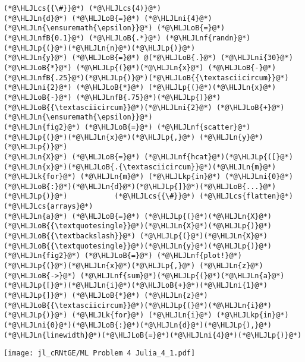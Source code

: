 \documentclass[12pt,a4paper]{article}
\newcommand{\HLJLk}[1]{\textcolor[RGB]{148,91,176}{\textbf{#1}}}
\newcommand{\HLJLkp}[1]{\textcolor[RGB]{148,91,176}{\textbf{#1}}}
\newcommand{\HLJLn}[1]{#1}
\newcommand{\HLJLnf}[1]{\textcolor[RGB]{66,102,213}{#1}}
\newcommand{\HLJLnfB}[1]{\textcolor[RGB]{59,151,46}{#1}}
\newcommand{\HLJLni}[1]{\textcolor[RGB]{59,151,46}{#1}}
\newcommand{\HLJLoB}[1]{\textcolor[RGB]{102,102,102}{\textbf{#1}}}
\newcommand{\HLJLp}[1]{#1}
\newcommand{\HLJLcs}[1]{\textcolor[RGB]{153,153,119}{\textit{#1}}}
\begin{document}
\begin{lstlisting}
(*@\HLJLcs{{\#}}@*) (*@\HLJLcs{4)}@*)
(*@\HLJLn{d}@*) (*@\HLJLoB{=}@*) (*@\HLJLni{4}@*)
(*@\HLJLn{\ensuremath{\epsilon}}@*) (*@\HLJLoB{=}@*) (*@\HLJLnfB{0.1}@*) (*@\HLJLoB{.*}@*) (*@\HLJLnf{randn}@*)(*@\HLJLp{(}@*)(*@\HLJLn{n}@*)(*@\HLJLp{)}@*)
(*@\HLJLn{y}@*) (*@\HLJLoB{=}@*) @(*@\HLJLoB{.}@*) (*@\HLJLni{30}@*) (*@\HLJLoB{*}@*) (*@\HLJLp{(}@*)(*@\HLJLn{x}@*) (*@\HLJLoB{-}@*) (*@\HLJLnfB{.25}@*)(*@\HLJLp{)}@*)(*@\HLJLoB{{\textasciicircum}}@*)(*@\HLJLni{2}@*) (*@\HLJLoB{*}@*) (*@\HLJLp{(}@*)(*@\HLJLn{x}@*) (*@\HLJLoB{-}@*) (*@\HLJLnfB{.75}@*)(*@\HLJLp{)}@*)(*@\HLJLoB{{\textasciicircum}}@*)(*@\HLJLni{2}@*) (*@\HLJLoB{+}@*) (*@\HLJLn{\ensuremath{\epsilon}}@*)
(*@\HLJLn{fig2}@*) (*@\HLJLoB{=}@*) (*@\HLJLnf{scatter}@*)(*@\HLJLp{(}@*)(*@\HLJLn{x}@*)(*@\HLJLp{,}@*) (*@\HLJLn{y}@*)(*@\HLJLp{)}@*)
(*@\HLJLn{X}@*) (*@\HLJLoB{=}@*) (*@\HLJLnf{hcat}@*)(*@\HLJLp{([}@*)(*@\HLJLn{x}@*)(*@\HLJLoB{.{\textasciicircum}}@*)(*@\HLJLn{m}@*) (*@\HLJLk{for}@*) (*@\HLJLn{m}@*) (*@\HLJLkp{in}@*) (*@\HLJLni{0}@*)(*@\HLJLoB{:}@*)(*@\HLJLn{d}@*)(*@\HLJLp{]}@*)(*@\HLJLoB{...}@*)(*@\HLJLp{)}@*)           (*@\HLJLcs{{\#}}@*) (*@\HLJLcs{flatten}@*) (*@\HLJLcs{arrays}@*)
(*@\HLJLn{a}@*) (*@\HLJLoB{=}@*) (*@\HLJLp{(}@*)(*@\HLJLn{X}@*)(*@\HLJLoB{{\textquotesingle}}@*)(*@\HLJLn{X}@*)(*@\HLJLp{)}@*) (*@\HLJLoB{{\textbackslash}}@*) (*@\HLJLp{(}@*)(*@\HLJLn{X}@*)(*@\HLJLoB{{\textquotesingle}}@*)(*@\HLJLn{y}@*)(*@\HLJLp{)}@*)
(*@\HLJLn{fig2}@*) (*@\HLJLoB{=}@*) (*@\HLJLnf{plot!}@*)(*@\HLJLp{(}@*)(*@\HLJLn{x}@*)(*@\HLJLp{,}@*) (*@\HLJLn{z}@*) (*@\HLJLoB{->}@*) (*@\HLJLnf{sum}@*)(*@\HLJLp{(}@*)(*@\HLJLn{a}@*)(*@\HLJLp{[}@*)(*@\HLJLn{i}@*)(*@\HLJLoB{+}@*)(*@\HLJLni{1}@*)(*@\HLJLp{]}@*) (*@\HLJLoB{*}@*) (*@\HLJLn{z}@*)(*@\HLJLoB{{\textasciicircum}}@*)(*@\HLJLp{(}@*)(*@\HLJLn{i}@*)(*@\HLJLp{)}@*) (*@\HLJLk{for}@*) (*@\HLJLn{i}@*) (*@\HLJLkp{in}@*) (*@\HLJLni{0}@*)(*@\HLJLoB{:}@*)(*@\HLJLn{d}@*)(*@\HLJLp{),}@*) (*@\HLJLn{linewidth}@*)(*@\HLJLoB{=}@*)(*@\HLJLni{4}@*)(*@\HLJLp{)}@*)
\end{lstlisting}

\texttt{[image: jl\_cRNtGE/ML Problem 4 Julia\_4\_1.pdf]}
\end{document}
